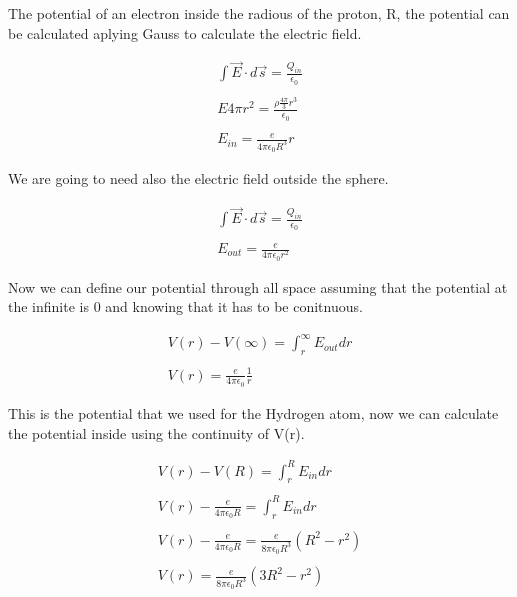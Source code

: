 The potential of an electron inside the radious of the proton, R, the potential can be calculated aplying Gauss to calculate the electric field.

\begin{equation}
\begin{array}{c}
  \int \vec{E} \cdot d\vec{s} = \frac{Q_{in}}{\epsilon_0}
  \\

  \\
  E 4\pi r^2 = \frac{\rho \frac{4\pi}{3}r^3}{\epsilon_0}
  \\

  \\
  E_{in}  = \frac{e}{4\pi\epsilon_0 R^3} r
\end{array}
\end{equation}

We are going to need also the electric field outside the sphere.

\begin{equation}
\begin{array}{c}
  \int \vec{E} \cdot d\vec{s} = \frac{Q_{in}}{\epsilon_0}
  \\

  \\
  E_{out} = \frac{e}{4\pi \epsilon_0 r^2}
\end{array}
\end{equation}

Now we can define our potential through all space assuming that the potential at the infinite is 0 and knowing that it has to be conitnuous.

\begin{equation}
  \begin{array}{c}
    V(r) - V(\infty) = \int_{r}^{\infty} E_{out} dr
    \\

    \\
    V(r) = \frac{e}{4\pi \epsilon_0} \frac{1}{r}
  \end{array}
\end{equation}

This is the potential that we used for the Hydrogen atom, now we can calculate the potential inside using the continuity of V(r).

\begin{equation}
  \begin{array}{c}
    V(r) - V(R) = \int_{r}^{R} E_{in} dr
    \\

    \\
    V(r) - \frac{e}{4\pi\epsilon_0 R} = \int_{r}^{R} E_{in} dr
    \\

    \\
    V(r) - \frac{e}{4\pi\epsilon_0 R} = \frac{e}{8\pi\epsilon_0 R^3} (R^2-r^2)
    \\

    \\
    V(r) = \frac{e}{8\pi\epsilon_0 R^3} (3R^2-r^2)
  \end{array}
\end{equation}

